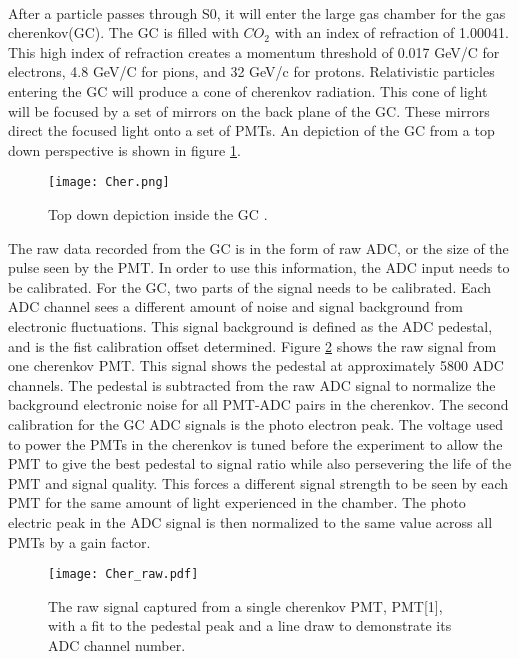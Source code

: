 	\paragraph{}After a particle passes through S0, it will enter the large gas chamber for the gas cherenkov(GC). The GC is filled with $CO_2$ with an index of refraction of 1.00041. This high index of refraction creates a momentum threshold of 0.017 GeV/C for electrons, 4.8 GeV/C for pions, and 32 GeV/c for protons\cite{GasC}. Relativistic particles entering the GC will produce a cone of cherenkov radiation. This cone of light will be focused by a set of mirrors on the back plane of the GC. These mirrors direct the focused light onto a set of PMTs. An depiction of the GC from a top down perspective is shown in figure \ref{fig:cer_TD}. 
	\begin{figure}[t]
		\centering
		\texttt{[image: Cher.png]}
		\caption{Top down depiction inside the GC \cite{GasC}.}
		\label{fig:cer_TD}
	\end{figure}
	The raw data recorded from the GC is in the form of raw ADC, or the size of the pulse seen by the PMT. In order to use this information, the ADC input needs to be calibrated. For the GC, two parts of the signal needs to be calibrated. Each ADC channel sees a different amount of noise and signal background from electronic fluctuations. This signal background is defined as the ADC pedestal, and is the fist calibration offset determined. Figure \ref{fig:cer_raw} shows the raw signal from one cherenkov PMT. This signal shows the pedestal at approximately 5800 ADC channels. The pedestal is subtracted from the raw ADC signal to normalize the background electronic noise for all PMT-ADC pairs in the cherenkov. The second calibration for the GC ADC signals is the photo electron peak. The voltage used to power the PMTs in the cherenkov is tuned before the experiment to allow the PMT to give the best pedestal to signal ratio while also persevering the life of the PMT and signal quality. This forces a different signal strength to be seen by each PMT for the same amount of light experienced in the chamber. The photo electric peak in the ADC signal is then normalized to the same value across all PMTs by a gain factor. 
	\begin{figure}[t]
		\centering
		\texttt{[image: Cher\_raw.pdf]}
		\caption{The raw signal captured from a single cherenkov PMT, PMT[1], with a fit to the pedestal peak and a line draw to demonstrate its ADC channel number.}
		\label{fig:cer_raw}
	\end{figure}
